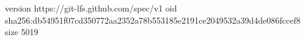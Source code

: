 version https://git-lfs.github.com/spec/v1
oid sha256:db54951f07cd350772aa2352a78b553185e2191ce2049532a39d4de086fccef8
size 5019
